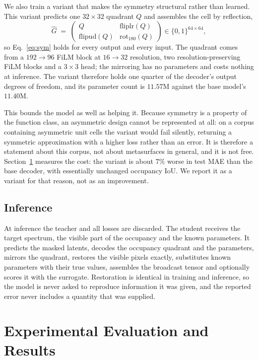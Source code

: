 \documentclass[pdflatex,oneside,sn-mathphys-num]{sn-jnl}
\theoremstyle{thmstyleone}
\theoremstyle{thmstyletwo}
\theoremstyle{thmstylethree}
\begin{document}
We also train a variant that makes the symmetry structural rather than learned. This
variant predicts one $32\times32$ quadrant $Q$ and assembles the cell by reflection,
\begin{equation}
\hat{G} \;=\;
\begin{pmatrix}
Q & \mathrm{fliplr}(Q)\\[2pt]
\mathrm{flipud}(Q) & \mathrm{rot}_{180}(Q)
\end{pmatrix}
\in\{0,1\}^{64\times64},
\label{eq:quad}
\end{equation}
so Eq.~\eqref{eq:sym} holds for every output and every input. The quadrant comes from a
$192\!\to\!96$ FiLM block at $16\!\to\!32$ resolution, two resolution-preserving FiLM
blocks and a $3\times3$ head; the mirroring has no parameters and costs nothing at
inference. The variant therefore holds one quarter of the decoder's output degrees of
freedom, and its parameter count is $11.57$M against the base model's $11.40$M.

This bounds the model as well as helping it. Because symmetry is a property of the
function class, an asymmetric design cannot be represented at all: on a corpus containing
asymmetric unit cells the variant would fail silently, returning a symmetric approximation
with a higher loss rather than an error. It is therefore a statement about this corpus, not
about metasurfaces in general, and it is not free. Section~\ref{sec4} measures the cost:
the variant is about $7\%$ worse in test MAE than the base decoder, with essentially
unchanged occupancy IoU. We report it as a variant for that reason, not as an improvement.

\subsection{Inference}

At inference the teacher and all losses are discarded. The student receives the target
spectrum, the visible part of the occupancy and the known parameters. It predicts the
masked latents, decodes the occupancy quadrant and the parameters, mirrors the quadrant,
restores the visible pixels exactly, substitutes known parameters with their true
values, assembles the broadcast tensor and optionally scores it with the surrogate.
Restoration is identical in training and inference, so the model is never asked to
reproduce information it was given, and the reported error never includes a quantity
that was supplied.

\section{Experimental Evaluation and Results}\label{sec4}
\end{document}
